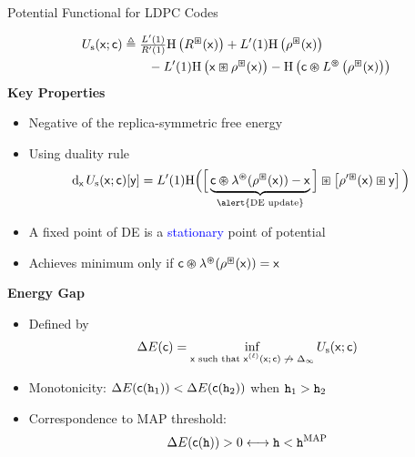 \documentclass{beamer}
\newlength{\twocolwid}
\begin{document}
\begin{columns}[t]
\begin{column}{\twocolwid}
\begin{block}{Potential Functional for LDPC Codes}
  \setlength\tikzheight{14.5cm}
  \setlength\tikzwidth{19cm} 
  
  \begin{align*}
    U_\mathrm{s}(\mathsf{x}; \mathsf{c}) &\triangleq  \tfrac{L'(1)}{R'(1)} \mathrm{H} \left( R^{\boxast}(\mathsf{x}) \right) + L'(1) \mathrm{H} \left(  \rho^{\boxast}(\mathsf{x})  \right) \\
    & \qquad - L'(1) \mathrm{H} \left( \mathsf{x} \boxast \rho^{\boxast}(\mathsf{x}) \right) - \mathrm{H} \left(  \mathsf{c} \varoast L^{\varoast} \left( \rho^{\boxast}(\mathsf{x}) \right)  \right) 
  \end{align*}
  \textcolor{jblue}{\bf Key Properties}
  \begin{itemize}
  \item Negative of the replica-symmetric free energy
  \item Using duality rule
    \begin{align*}
      \deri{\msx} \pots( \msx ; \msc ) [\msy] &= L'(1) \mathrm{H} \Big{(} \Big{[} \underbrace{\msc \vnop \lambda^{\vnop}(\rho^{\cnop}(\msx)) - \msx}_{\alert{\text{DE update}}} \Big{]} \cnop \left[ \rho'^{\cnop}(\msx) \cnop \msy \right] \Big{)}
    \end{align*}
  \item A fixed point of DE is a \textcolor{blue}{stationary} point of potential
  \item Achieves minimum only if $\mathsf{c} \varoast \lambda^{\varoast}(\rho^{\boxast}(\mathsf{x})) = \mathsf{x}$

  \end{itemize}
  \vspace{0.8cm}
  \textcolor{jblue}{\bf Energy Gap}
  \begin{itemize}
  \item Defined by
    \begin{align*}
      \Delta E(\mathsf{c}) = \inf_{\text{$\mathsf{x}$ such that $\mathsf{x}^{(\ell)}(\mathsf{x} ; \mathsf{c}) \not \to \Delta_\infty$}} U_\mathrm{s}(\mathsf{x} ; \mathsf{c})
    \end{align*}
  \item Monotonicity: $\Delta E(\mathsf{c}(\texttt{h}_1)) < \Delta E(\mathsf{c}(\texttt{h}_2)) $ when $\texttt{h}_1 > \texttt{h}_2$
  \item Correspondence to MAP threshold: $$\Delta E(\mathsf{c}(\texttt{h})) > 0  \longleftrightarrow  \texttt{h} < \texttt{h}^{\mathrm{MAP}}$$
  \end{itemize}
  
\end{block}


\end{column}
\end{columns}
\end{document}
